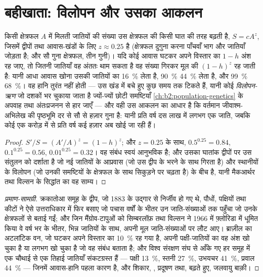 \section{बहीखाता: विलोपन और उसका आकलन}

\begin{theorem}[जाति--क्षेत्रफल संबंध और आवास-हानि की लागत]\label{thm:b2:global-change:sar}
किसी क्षेत्रफल $A$ में मिलती जातियों की संख्या उस क्षेत्रफल की किसी
घात की तरह बढ़ती है, $S = cA^{z}$, जिसमें द्वीपों तथा
आवास-खंडों के लिए $z \approx 0.25$ है (क्षेत्रफल दुगुना करना पाँचवाँ भाग और जातियाँ जोड़ता है; और
सौ गुना क्षेत्रफल, तीन गुनी)। यदि कोई आवास घटकर अपने विस्तार का
$1 - h$ अंश रह जाए, तो जितनी जातियाँ वह अंततः थाम सकता है वह संख्या
गिरकर मूल की $(1 - h)^{z}$ रह जाती है: यानी आधा आवास खोना
उसकी जातियों का \qty{16}{\%} लेता है, \qty{90}{\%} \qty{44}{\%} लेता है, और \qty{99}{\%}
\qty{68}{\%}। वह हानि तुरंत नहीं होती --- उस खंड में बचे हुए
कुछ समय तक टिकते हैं, यानी कोई \emph{विलोपन-ऋण} जो दशकों भर चुकाया जाता है
ज्यों-ज्यों छोटी समष्टियाँ \cref{ch:b2:population-genetics} के अपवाह तथा अंतःप्रजनन से
हार जाएँ --- और वही उस
आकलन का आधार है कि वर्तमान  जीवाश्म-अभिलेख की पृष्ठभूमि दर से
सौ से हज़ार गुना है: यानी प्रति वर्ष दस लाख में लगभग एक
जाति, जबकि कोई एक करोड़ में से प्रति वर्ष कई हज़ार
अब खोई जा रही हैं।
\end{theorem}
\begin{proof}
$S'/S = (A'/A)^{z} = (1 - h)^{z}$; और $z = 0.25$ के साथ, $0.5^{0.25} =
0.84$, $0.1^{0.25} = 0.56$, $0.01^{0.25} = 0.32$। वह संबंध
स्वयं आनुभविक है; और उसका घातांक द्वीपों पर उस संतुलन को दर्शाता है
जो नई जातियों के आप्रवास (जो उस द्वीप के भरने के साथ गिरता है)
और स्थानीयों के विलोपन (जो उनकी समष्टियों के क्षेत्रफल के साथ सिकुड़ने पर चढ़ता है) के बीच है,
यानी मैकआर्थर तथा विल्सन के सिद्धांत का वह साम्य।
\end{proof}
\begin{proof}[प्रमाण-सामग्री]
क्रकातोआ समूह के द्वीप, जो 1883 के उद्गार से निर्जीव हो गए थे,
पौधों, पक्षियों तथा कीटों ने ऐसे उत्तराधिकार में फिर बसाए
जो पचास वर्षों के भीतर उन जाति-संख्याओं तक पहुँचा
जो उनके क्षेत्रफलों से बताई गईं; और जिन मैंग्रोव-टापुओं को सिम्बरलॉफ़ तथा
विल्सन ने 1966 में फ़्लोरिडा में धूमित किया वे वर्ष भर के भीतर, भिन्न जातियों के साथ,
अपनी मूल जाति-संख्याओं पर लौट आए। ब्राज़ील का अटलांटिक
वन, जो घटकर अपने विस्तार का \qty{10}{\%} रह गया है, अपनी पक्षी-जातियों का वह अंश
खो चुका है या लगभग खो चुका है जो वह संबंध
बताता है; और विश्व संरक्षण संघ से आँके गए हर समूह में
एक चौथाई से एक तिहाई जातियाँ संकटग्रस्त हैं --- पक्षी
\qty{13}{\%}, स्तनी \qty{27}{\%}, उभयचर \qty{41}{\%}, प्रवाल
\qty{44}{\%} --- जिनमें आवास-हानि पहला कारण है, और शिकार,
, प्रदूषण तथा, बढ़ते हुए, जलवायु बाक़ी।
\end{proof}

